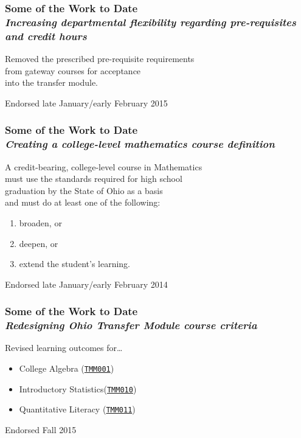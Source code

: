 \documentclass[14pt]{beamer}
\newcounter{a}
\newcounter{b}
\begin{document}
\begin{frame}
  \frametitle{Some of the Work to Date \\ \textit{Increasing departmental flexibility regarding pre-requisites
    and credit hours}}

Removed the prescribed pre-requisite requirements \\
\quad from gateway courses for acceptance \\
\quad\quad into the transfer module.

\vfill\hfill\textcolor{dark}{\footnotesize Endorsed late January/early February 2015}
\end{frame}

\begin{frame}
  \frametitle{Some of the Work to Date \\
    \textit{Creating a college-level mathematics course definition}}

  A credit-bearing, college-level course in Mathematics \\
  \quad must use the standards required for high school \\
  \quad\quad graduation by the State of Ohio
  as a basis \\
  \quad and must do at least one of the following:
\begin{enumerate}
\item broaden\textcolor{dark}{, or}
\item deepen\textcolor{dark}{, or}
\item extend the student's learning.
\end{enumerate}

\vfill\hfill\textcolor{dark}{\footnotesize Endorsed late January/early February 2014}
\end{frame}

\begin{frame}
  \frametitle{Some of the Work to Date \\ \textit{Redesigning Ohio Transfer Module course criteria}}

Revised learning outcomes for\ldots

\begin{itemize}
\item College Algebra \hfill\textcolor{dark}{(\href{http://regents.ohio.gov/transfer/otm/math-stats-log/TMM001-College-Algebra.pdf}{\texttt{TMM001}})}
\item Introductory Statistics\hfill\textcolor{dark}{(\href{http://regents.ohio.gov/transfer/otm/math-stats-log/TMM010.pdf}{\texttt{TMM010}})}
\item Quantitative Literacy\hfill\textcolor{dark}{ (\href{https://www.ohiohighered.org/sites/ohiohighered.org/files/uploads/transfer/documents/OTM/TMM011 Quantitative Reasoning FINALIZED v2- 12-21-2015.pdf}{\texttt{TMM011}})}
\end{itemize}

\vfill\hfill\textcolor{dark}{\footnotesize Endorsed Fall 2015}
  \end{frame}
\end{document}
